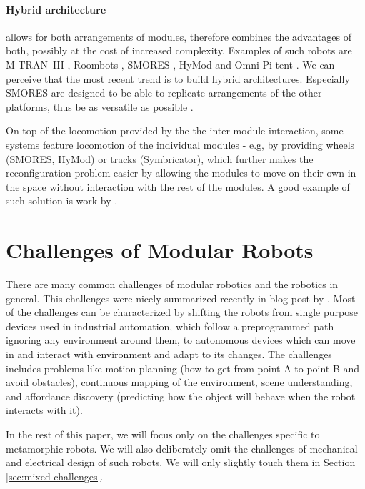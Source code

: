 \paragraph{Hybrid architecture} allows for both arrangements of modules,
therefore combines the advantages of both, possibly at the cost of increased
complexity. Examples of such robots are M-TRAN~III
\cite{DBLP:journals/ijrr/KurokawaTKKHM08}, Roombots
\cite{DBLP:conf/icra/SprowitzBDI09}, SMORES \cite{DBLP:conf/iros/DaveyKY12},
HyMod \cite{DBLP:conf/dars/ParrottDG16} and Omni-Pi-tent
\cite{DBLP:conf/taros/PeckTT19}. We can perceive that the most recent trend is
to build hybrid architectures. Especially SMORES are designed to be able to
replicate arrangements of the other platforms, thus be as versatile as possible
\cite{DBLP:conf/iros/DaveyKY12}.

On top of the locomotion provided by the the inter-module interaction, some
systems feature locomotion of the individual modules - e.g, by providing wheels
(SMORES, HyMod) or tracks (Symbricator), which further makes the reconfiguration
problem easier by allowing the modules to move on their own in the space without
interaction with the rest of the modules. A good example of such solution is
work by \textcite{DBLP:journals/ral/LiuWY19}.

\section{Challenges of Modular Robots}

There are many common challenges of modular robotics and the robotics in
general. This challenges were nicely summarized recently in blog post by
\textcite{locklin_2020}. Most of the challenges can be characterized by shifting
the robots from single purpose devices used in industrial automation, which
follow a preprogrammed path ignoring any environment around them, to autonomous
devices which can move in and interact with environment and adapt to its
changes. The challenges includes problems like motion planning (how to get from
point A to point B and avoid obstacles), continuous mapping of the environment,
scene understanding, and affordance discovery (predicting how the object will
behave when the robot interacts with it).

In the rest of this paper, we will focus only on the challenges specific to
metamorphic robots. We will also deliberately omit the challenges of mechanical
and electrical design of such robots. We will only slightly touch them in
Section \ref{sec:mixed-challenges}.

